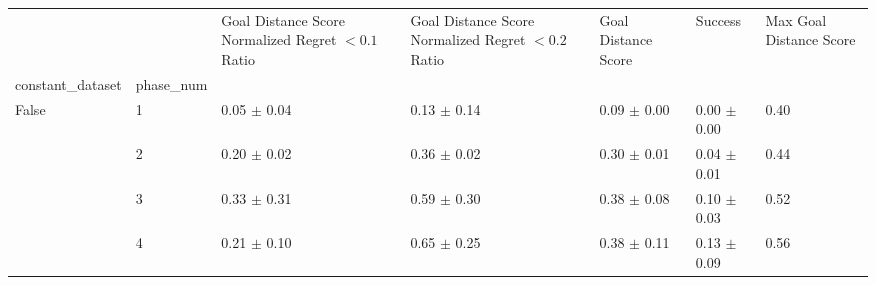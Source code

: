 \begin{tabular}{lllllll}
\toprule
 &  & Goal Distance Score Normalized Regret $< 0.1$ Ratio & Goal Distance Score Normalized Regret $< 0.2$ Ratio & Goal Distance Score & Success & Max Goal Distance Score \\
constant_dataset & phase_num &  &  &  &  &  \\
\midrule
\multirow[t]{4}{*}{False} & 1 & 0.05 $\pm$ 0.04 & 0.13 $\pm$ 0.14 & 0.09 $\pm$ 0.00 & 0.00 $\pm$ 0.00 & 0.40 \\
 & 2 & 0.20 $\pm$ 0.02 & 0.36 $\pm$ 0.02 & 0.30 $\pm$ 0.01 & 0.04 $\pm$ 0.01 & 0.44 \\
 & 3 & 0.33 $\pm$ 0.31 & 0.59 $\pm$ 0.30 & 0.38 $\pm$ 0.08 & 0.10 $\pm$ 0.03 & 0.52 \\
 & 4 & 0.21 $\pm$ 0.10 & 0.65 $\pm$ 0.25 & 0.38 $\pm$ 0.11 & 0.13 $\pm$ 0.09 & 0.56 \\
\cline{1-7}
\bottomrule
\end{tabular}
